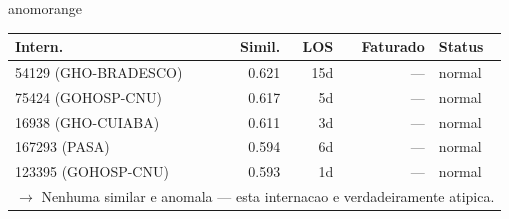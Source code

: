 \documentclass[a4paper,10pt]{article}
\begin{document}
\begin{anomalycard}[Internacao 10387 | GHO-POSTAL | ALTO (z=3.71)]{anomorange}
\begin{tabular}{l r r r l}\toprule\textbf{Intern.} & \textbf{Simil.} & \textbf{LOS} & \textbf{Faturado} & \textbf{Status} \\\midrule
54129 (GHO-BRADESCO) & 0.621 & 15d & --- & \textcolor{jcubeblue}{normal} \\
75424 (GOHOSP-CNU) & 0.617 & 5d & --- & \textcolor{jcubeblue}{normal} \\
16938 (GHO-CUIABA) & 0.611 & 3d & --- & \textcolor{jcubeblue}{normal} \\
167293 (PASA) & 0.594 & 6d & --- & \textcolor{jcubeblue}{normal} \\
123395 (GOHOSP-CNU) & 0.593 & 1d & --- & \textcolor{jcubeblue}{normal} \\
\multicolumn{5}{l}{\textcolor{jcubeblue}{\small $\rightarrow$ Nenhuma similar e anomala --- esta internacao e verdadeiramente atipica.}} \\
\bottomrule\end{tabular}


\end{anomalycard}

\newpage
\end{document}
